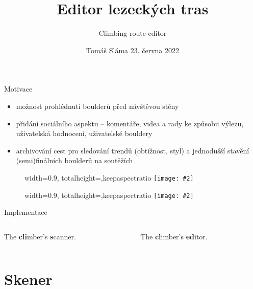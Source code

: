 \documentclass[czech]{beamer}
\title{Editor lezeckých tras}
\subtitle{Climbing route editor}
\author{}
\date{Tomáš Sláma \hfill 23. června 2022}
\makeatletter
\newcommand{\fitimage}[2][\@nil]{
	\begin{figure}
		\begin{adjustbox}{width=0.9\textwidth, totalheight=\textheight-2\baselineskip-2\baselineskip,keepaspectratio}
			\texttt{[image: \#2]}
		\end{adjustbox}
		\def\tmp{#1}%
	 \ifx\tmp\@nnil
			\else
			\caption*{#1}
		\fi
	\end{figure}
}
\makeatother
\begin{document}
	\begin{frame}
		\maketitle
	\end{frame}

	\begin{frame}{Motivace}
		\begin{itemize}
			\item možnost prohlédnutí boulderů před návštěvou stěny
			\item přidání sociálního aspektu -- komentáře, videa a rady ke způsobu výlezu, uživatelská hodnocení, uživatelské bouldery
			\item archivování cest pro sledování trendů (obtížnost, styl) a jednodušší stavění (semi)finálních boulderů na soutěžích
		\end{itemize}

		\begin{minipage}[t]{0.5\textwidth}
			\fitimage{images/capture-1}
		\end{minipage}%
		\hfill
		\begin{minipage}[t]{0.5\textwidth}
			\fitimage{images/capture-2}
		\end{minipage}
	\end{frame}

	\begin{frame}{Implementace}
		\begin{columns}[c]
			\begin{column}{0.5\textwidth}
				\begin{center}
					

					The \textbf{cli}mber's \textbf{s}canner.
				\end{center}
			\end{column}
			\begin{column}{0.5\textwidth}
				\begin{center}
					

					The \textbf{cl}imber's \textbf{ed}itor.
				\end{center}
			\end{column}
		\end{columns}

	\end{frame}

	\section{Skener}
\end{document}
